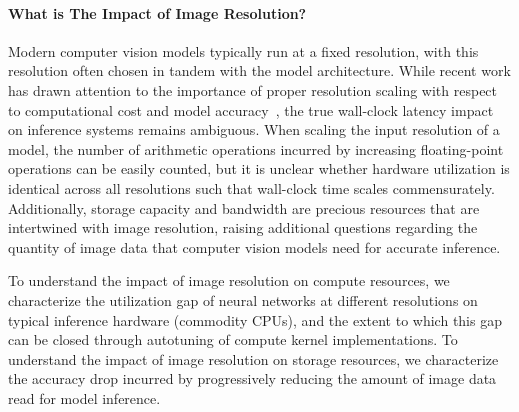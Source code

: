 
\paragraph{What is The Impact of Image Resolution?}
Modern computer vision models typically run at a fixed resolution, with this resolution often chosen in tandem with the model architecture.
While recent work has drawn attention to the importance of proper resolution scaling with respect to computational cost and model accuracy~\cite{tan2019efficientnet}, the true wall-clock latency impact on inference systems remains ambiguous.
When scaling the input resolution of a model, the number of arithmetic operations incurred by increasing floating-point operations can be easily counted, but it is unclear whether hardware utilization is identical across all resolutions such that wall-clock time scales commensurately.
Additionally, storage capacity and bandwidth are precious resources that are intertwined with image resolution, raising additional questions regarding the quantity of image data that computer vision models need for accurate inference.

To understand the impact of image resolution on compute resources, we characterize the utilization gap of neural networks at different resolutions on typical inference hardware (commodity CPUs), and the extent to which this gap can be closed through autotuning of compute kernel implementations.
To understand the impact of image resolution on storage resources, we characterize the accuracy drop incurred by progressively reducing the amount of image data read for model inference.

